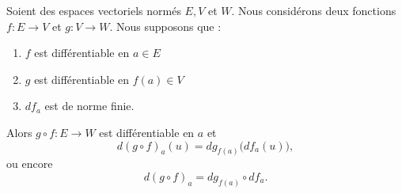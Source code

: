 \begin{theorem}     \label{THOooIHPIooIUyPaf}
	Soient des espaces vectoriels normés \( E,V\) et \( W\). Nous considérons deux fonctions \( f\colon E\to V\) et \( g\colon V\to W\). Nous supposons que :
	\begin{enumerate}
		\item
		      \( f\) est différentiable en \( a\in E\)
		\item
		      \( g\) est différentiable en \( f(a)\in V\)
		\item
		      \( df_a\) est de norme finie.
	\end{enumerate}
	Alors \( g\circ f\colon E\to W\) est différentiable en \( a\) et
	\begin{equation}
		d(g\circ f)_a(u)=dg_{f(a)}\big( df_a(u) \big),
	\end{equation}
	ou encore
	\begin{equation}
		d(g\circ f)_a=dg_{f(a)}\circ df_a.
	\end{equation}
\end{theorem}

